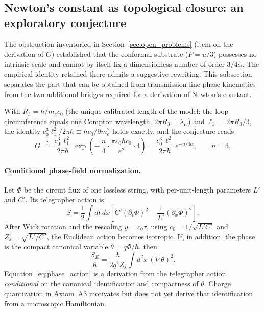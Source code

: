 \documentclass[11pt,a4paper]{article}
\theoremstyle{plain}
\theoremstyle{remark}
\begin{document}
\subsection{Newton's constant as topological closure: an exploratory conjecture}
\label{sec:g_closure}
The obstruction inventoried in Section~\ref{sec:open_problems} (item on the derivation of $G$) established that the conformal substrate ($P = u/3$) possesses no intrinsic scale and cannot by itself fix a dimensionless number of order $3/4\alpha$. The empirical identity retained there admits a suggestive rewriting. This subsection separates the part that can be obtained from transmission-line phase kinematics from the two additional bridges required for a derivation of Newton's constant.

With $R_3 = \hbar/m_e c_0$ (the unique calibrated length of the model: the loop circumference equals one Compton wavelength, $2\pi R_3 = \lambda_C$) and $\ell_1 = 2\pi R_3/3$, the identity $c_0^3\ell_1^2/2\pi\hbar \equiv hc_0/9m_e^2$ holds exactly, and the conjecture reads
\begin{equation}
G \;\stackrel{?}{=}\; \frac{c_0^3\,\ell_1^2}{2\pi\hbar}\,
\exp\!\left(-\,\frac{n}{4}\cdot\frac{\pi\varepsilon_0\hbar c_0}{e^2}\cdot 4\right)
= \frac{c_0^3\,\ell_1^2}{2\pi\hbar}\, e^{-n/4\alpha},
\qquad n = 3.
\label{eq:g_closure}
\end{equation}
\paragraph{Conditional phase-field normalization.} Let $\Phi$ be the circuit flux of one lossless string, with per-unit-length parameters $L'$ and $C'$. Its telegrapher action is
\begin{equation}
S=\frac12\int dt\,dx\left[C'(\partial_t\Phi)^2-\frac{1}{L'}(\partial_x\Phi)^2\right].
\end{equation}
After Wick rotation and the rescaling $y=c_0\tau$, using $c_0=1/\sqrt{L'C'}$ and $Z_s=\sqrt{L'/C'}$, the Euclidean action becomes isotropic. If, in addition, the phase is the compact canonical variable $\theta=q\Phi/\hbar$, then
\begin{equation}
\frac{S_E}{\hbar}=\frac{\hbar}{2q^2Z_s}\int d^2x\,(\nabla\theta)^2.
\label{eq:phase_action}
\end{equation}
Equation~\eqref{eq:phase_action} is a derivation from the telegrapher action \emph{conditional} on the canonical identification and compactness of $\theta$. Charge quantization in Axiom~A3 motivates but does not yet derive that identification from a microscopic Hamiltonian.
\end{document}
